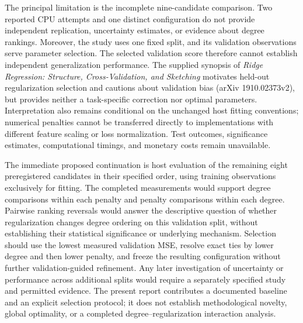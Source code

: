 \documentclass[11pt]{article}
\begin{document}
The principal limitation is the incomplete nine-candidate comparison. Two reported CPU attempts and one distinct configuration do not provide independent replication, uncertainty estimates, or evidence about degree rankings. Moreover, the study uses one fixed split, and its validation observations serve parameter selection. The selected validation score therefore cannot establish independent generalization performance. The supplied synopsis of \emph{Ridge Regression: Structure, Cross-Validation, and Sketching} motivates held-out regularization selection and cautions about validation bias (arXiv 1910.02373v2), but provides neither a task-specific correction nor optimal parameters. Interpretation also remains conditional on the unchanged host fitting conventions; numerical penalties cannot be transferred directly to implementations with different feature scaling or loss normalization. Test outcomes, significance estimates, computational timings, and monetary costs remain unavailable.

The immediate proposed continuation is host evaluation of the remaining eight preregistered candidates in their specified order, using training observations exclusively for fitting. The completed measurements would support degree comparisons within each penalty and penalty comparisons within each degree. Pairwise ranking reversals would answer the descriptive question of whether regularization changes degree ordering on this validation split, without establishing their statistical significance or underlying mechanism. Selection should use the lowest measured validation MSE, resolve exact ties by lower degree and then lower penalty, and freeze the resulting configuration without further validation-guided refinement. Any later investigation of uncertainty or performance across additional splits would require a separately specified study and permitted evidence. The present report contributes a documented baseline and an explicit selection protocol; it does not establish methodological novelty, global optimality, or a completed degree--regularization interaction analysis.
\end{document}
